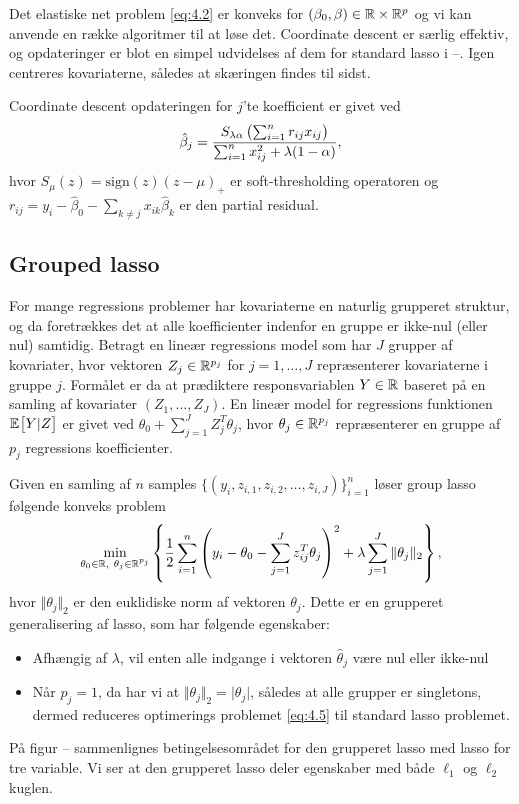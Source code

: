 Det elastiske net problem \eqref{eq:4.2} er konveks for $(\beta_0, \beta) \in \mathbb{R} \times \mathbb{R}^p$ og vi kan anvende en række algoritmer til at løse det. 
Coordinate descent er særlig effektiv, og opdateringer er blot en simpel udvidelses af dem for standard lasso i --.
Igen centreres kovariaterne, således at skæringen findes til sidst.

Coordinate descent opdateringen for $j$'te koefficient er givet ved
\begin{align*}
\hat{\beta}_j = \frac{S_{\lambda \alpha} \del{\sum_{i=1}^n r_{ij} x_{ij}}}{\sum_{i=1}^n x_{ij}^2 + \lambda (1-\alpha)},
\end{align*} 
hvor $S_\mu(z)=\text{sign}(z)(z-\mu)_+$ er soft-thresholding operatoren og $r_{ij}=y_i - \hat{\beta}_0 - \sum_{k \neq j} x_{ik} \hat{\beta}_k$ er den partial residual.


\subsection{Grouped lasso}
For mange regressions problemer har kovariaterne en naturlig grupperet struktur, og da foretrækkes det at alle koefficienter indenfor en gruppe er ikke-nul (eller nul) samtidig.
Betragt en lineær regressions model som har $J$ grupper af kovariater, hvor vektoren $Z_j \in \mathbb{R}^{p_j}$ for $j=1, \ldots, J$ repræsenterer kovariaterne i gruppe $j$.
Formålet er da at prædiktere responsvariablen $Y \in \mathbb{R}$ baseret på en samling af kovariater $(Z_1,\ldots,Z_J)$.
En lineær model for regressions funktionen $\E{Y \vert Z}$ er givet ved \(\theta_0 + \sum_{j=1}^J Z_j^T \theta_j\), hvor $\theta_j \in \mathbb{R}^{p_j}$ repræsenterer en gruppe af $p_j$ regressions koefficienter. 

Given en samling af $n$ samples \(\{(y_i, z_{i,1}, z_{i,2}, \ldots, z_{i,J})\}_{i=1}^n\) løser group lasso følgende konveks problem
\begin{align}
\min_{\theta_0 \in \R, \ \theta_j \in \R^{p_j}} \cbr{\frac{1}{2} \sum_{i=1}^n \del{y_i - \theta_0 - \sum_{j=1}^J z_{ij}^T \theta_j}^2 + \lambda \sum_{j=1}^J \Vert \theta_j \Vert_2},\label{eq:4.5}
\end{align}
hvor $\Vert \theta_j \Vert_2$ er den euklidiske norm af vektoren $\theta_j$.
Dette er en grupperet generalisering af lasso, som har følgende egenskaber:
\begin{itemize}
\item Afhængig af $\lambda$, vil enten alle indgange i vektoren $\hat{\theta}_j$ være nul eller ikke-nul
\item Når $p_j=1$, da har vi at $\Vert \theta_j \Vert_2 = \vert \theta_j \vert$, således at alle grupper er singletons, dermed reduceres optimerings problemet \eqref{eq:4.5} til standard lasso problemet.
\end{itemize}
På figur -- sammenlignes betingelsesområdet for den grupperet lasso med lasso for tre variable.
Vi ser at den grupperet lasso deler egenskaber med både $\ell_1$ og $\ell_2$ kuglen.

